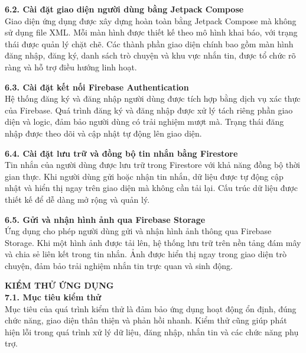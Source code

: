 \documentclass[12pt,a4paper]{article}
\begin{document}
	\vspace{0.3cm}
	\noindent\textbf{6.2. Cài đặt giao diện người dùng bằng Jetpack Compose} \\
	Giao diện ứng dụng được xây dựng hoàn toàn bằng Jetpack Compose mà không sử dụng file XML. Mỗi màn hình được thiết kế theo mô hình khai báo, với trạng thái được quản lý chặt chẽ. Các thành phần giao diện chính bao gồm màn hình đăng nhập, đăng ký, danh sách trò chuyện và khu vực nhắn tin, được tổ chức rõ ràng và hỗ trợ điều hướng linh hoạt.
	
	\vspace{0.3cm}
	\noindent\textbf{6.3. Cài đặt kết nối Firebase Authentication} \\
	Hệ thống đăng ký và đăng nhập người dùng được tích hợp bằng dịch vụ xác thực của Firebase. Quá trình đăng ký và đăng nhập được xử lý tách riêng phần giao diện và logic, đảm bảo người dùng có trải nghiệm mượt mà. Trạng thái đăng nhập được theo dõi và cập nhật tự động lên giao diện.
	
	\vspace{0.3cm}
	\noindent\textbf{6.4. Cài đặt lưu trữ và đồng bộ tin nhắn bằng Firestore} \\
	Tin nhắn của người dùng được lưu trữ trong Firestore với khả năng đồng bộ thời gian thực. Khi người dùng gửi hoặc nhận tin nhắn, dữ liệu được tự động cập nhật và hiển thị ngay trên giao diện mà không cần tải lại. Cấu trúc dữ liệu được thiết kế để dễ dàng mở rộng và quản lý.
	
	\vspace{0.3cm}
	\noindent\textbf{6.5. Gửi và nhận hình ảnh qua Firebase Storage} \\
	Ứng dụng cho phép người dùng gửi và nhận hình ảnh thông qua Firebase Storage. Khi một hình ảnh được tải lên, hệ thống lưu trữ trên nền tảng đám mây và chia sẻ liên kết trong tin nhắn. Ảnh được hiển thị ngay trong giao diện trò chuyện, đảm bảo trải nghiệm nhắn tin trực quan và sinh động.
	
	\textbf{KIỂM THỬ ỨNG DỤNG} \\
	
	\textbf{7.1. Mục tiêu kiểm thử} \\
	Mục tiêu của quá trình kiểm thử là đảm bảo ứng dụng hoạt động ổn định, đúng chức năng, giao diện thân thiện và phản hồi nhanh. Kiểm thử cũng giúp phát hiện lỗi trong quá trình xử lý dữ liệu, đăng nhập, nhắn tin và các chức năng phụ trợ.
	
\end{document}
